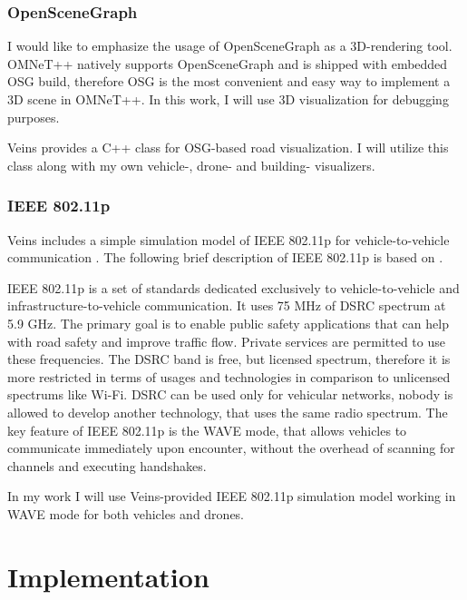 \documentclass[]{nsm-thesis}
\begin{document}
\subsection{OpenSceneGraph}

I would like to emphasize the usage of OpenSceneGraph \cite{osg} as a 3D-rendering tool. OMNeT++ natively supports OpenSceneGraph \cite{omnetpposg} and is shipped with embedded \ac{OSG} build, therefore \ac{OSG} is the most convenient and easy way to implement a 3D scene in OMNeT++. In this work, I will use 3D visualization for debugging purposes.

Veins provides a C++ class for \ac{OSG}-based road visualization. I will utilize this class along with my own vehicle-, drone- and building- visualizers.



\subsection{IEEE 802.11p}
Veins includes a simple simulation model of IEEE 802.11p for vehicle-to-vehicle communication \cite[Page~216]{Sommer2019}. The following brief description of IEEE 802.11p is based on \textcite{jiang2008ieee}.

IEEE 802.11p is a set of standards dedicated exclusively to vehicle-to-vehicle and infrastructure-to-vehicle communication. It uses 75 MHz of \ac{DSRC} spectrum at 5.9 GHz. The primary goal is to enable public safety applications that can help with road safety and improve traffic flow. Private services are permitted to use these frequencies. The \ac{DSRC} band is free, but licensed spectrum, therefore it is more restricted in terms of usages and technologies in comparison to unlicensed spectrums like Wi-Fi. \ac{DSRC} can be used only for vehicular networks, nobody is allowed to develop another technology, that uses the same radio spectrum. The key feature of IEEE 802.11p is the WAVE mode, that allows vehicles to communicate immediately upon encounter, without the overhead of scanning for channels and executing handshakes. 

In my work I will use Veins-provided IEEE 802.11p simulation model working in WAVE mode for both vehicles and drones.



\chapter{Implementation}
\end{document}
